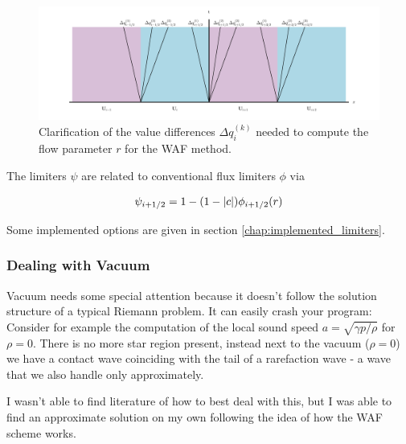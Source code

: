 \begin{figure}[htpb]
	\centering
	\includegraphics[width=\textwidth]{figures/WAF-hydro-delta-q.pdf}%
	\caption{
		Clarification of the value differences $\Delta q _{i}^{(k)}$ needed to compute the flow parameter $r$ for the WAF method.
		\label{fig:WAF-delta-q}
	}
\end{figure}



The limiters $\psi$ are related to conventional flux limiters $\phi$ via

\begin{equation}
	\psi_{i+1/2} = 1 - ( 1 - |c|) \phi_{i+1/2}(r)
\end{equation}

Some implemented options are given in section \ref{chap:implemented_limiters}.












\subsubsection{Dealing with Vacuum}\label{chap:hydro-WAF-vacuum}


Vacuum needs some special attention because it doesn't follow the solution structure of a typical Riemann problem.
It can easily crash your program:
Consider for example the computation of the local sound speed $a = \sqrt{\gamma p/\rho}$ for $\rho = 0$.
There is no more star region present, instead next to the vacuum ($\rho = 0$) we have a contact wave coinciding with the tail of a rarefaction wave - a wave that we also handle only approximately.

I wasn't able to find literature of how to best deal with this, but I was able to find an approximate solution on my own following the idea of how the WAF scheme works.

